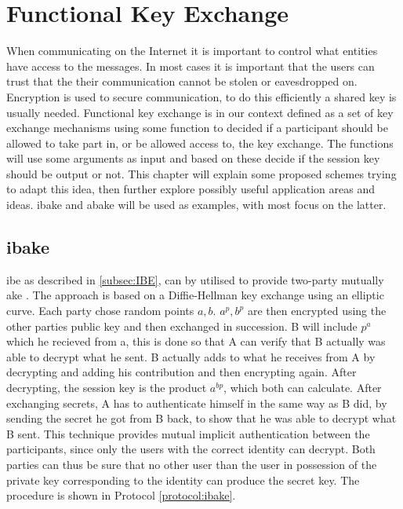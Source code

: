 \chapter{Functional Key Exchange}\label{chp:funckeyenc} 
When communicating on the Internet it is important to control what entities have access to the messages. In most cases it is important that the users can trust that the their communication cannot be stolen or eavesdropped on. Encryption is used to secure communication, to do this efficiently a shared key is usually needed. Functional key exchange is in our context defined as a set of key exchange mechanisms using some function to decided if a participant should be allowed to take part in, or be allowed access to, the key exchange. The functions will use some arguments as input and based on these decide if the session key should be output or not. This chapter will explain some proposed schemes trying to adapt this idea, then further explore possibly useful application areas and ideas. \Gls{ibake} and \gls{abake} will be used as examples, with most focus on the latter.

\section{\Glsdesc{ibake}}
\Gls{ibe} as described in \ref{subsec:IBE}, can by utilised to provide two-party mutually \gls{ake} \cite{ibake}. The approach is based on a Diffie-Hellman key exchange using an elliptic curve. Each party chose random points $a,b$. $a^p, b^p$ are then encrypted using the other parties public key and then exchanged in succession. B will include $p^a$ which he recieved from a, this is done so that A can verify that B actually was able to decrypt what he sent. B actually adds to what he receives from A by decrypting and adding his contribution and then encrypting again. After decrypting, the session key is the product $a^{bp}$, which both can calculate. After exchanging secrets, A has to authenticate himself in the same way as B did, by sending the secret he got from B back, to show that he was able to decrypt what B sent. This technique provides mutual implicit authentication between the participants, since only the users with the correct identity can decrypt. Both parties can thus be sure that no other user than the user in possession of the private key corresponding to the identity can produce the secret key. The procedure is shown in Protocol \ref{protocol:ibake}.

